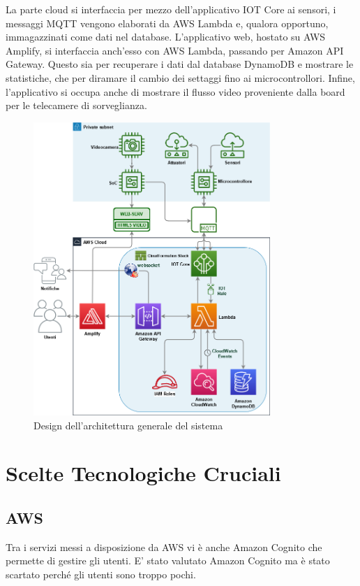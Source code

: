     La parte cloud si interfaccia per mezzo dell'applicativo IOT Core ai sensori, i messaggi MQTT vengono elaborati da AWS Lambda e, qualora opportuno, immagazzinati come dati nel database. L'applicativo web, hostato su AWS Amplify, si interfaccia anch'esso con AWS Lambda, passando per Amazon API Gateway. Questo sia per recuperare i dati dal database DynamoDB e mostrare le statistiche, che per diramare il cambio dei settaggi fino ai microcontrollori. Infine, l'applicativo si occupa anche di mostrare il flusso video proveniente dalla board per le telecamere di sorveglianza. 
    \begin{figure}[H]
        \caption{Design dell'architettura generale del sistema}
        \label{fig:DesignArchitettura}
        \centering
       \includegraphics[width=0.8\textwidth]{DrawIo/Architecture.png}
    \end{figure}
    
    \section{Scelte Tecnologiche Cruciali}
        \subsection{AWS}
        Tra i servizi messi a disposizione da AWS vi è anche Amazon Cognito che permette di gestire gli utenti. 
        E' stato valutato Amazon Cognito ma è stato scartato perché gli utenti sono troppo pochi.
        
